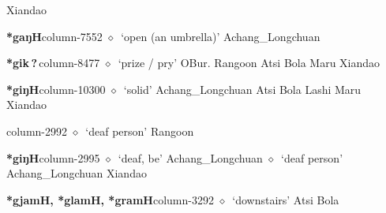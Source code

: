          Xiandao 
  \item {\footnotesize \textbf{*gaŋH}}{\tiny column-7552}
         $\diamond$~`open (an umbrella)'
         Achang\_Longchuan 
  \item {\footnotesize \textbf{*gik\,?\,}}{\tiny column-8477}
         $\diamond$~`prize / pry'
         OBur. 
\hspace{1ex}
         Rangoon 
\hspace{1ex}
         Atsi 
\hspace{1ex}
         Bola 
\hspace{1ex}
         Maru 
\hspace{1ex}
         Xiandao 
  \item {\footnotesize \textbf{*giŋH}}{\tiny column-10300}
         $\diamond$~`solid'
         Achang\_Longchuan 
\hspace{1ex}
         Atsi 
\hspace{1ex}
         Bola 
\hspace{1ex}
         Lashi 
\hspace{1ex}
         Maru 
\hspace{1ex}
         Xiandao 
  \item {\footnotesize \textbf{}}{\tiny column-2992}
         $\diamond$~`deaf person'
         Rangoon 
  \item {\footnotesize \textbf{*giŋH}}{\tiny column-2995}
         $\diamond$~`deaf, be'
         Achang\_Longchuan 
\hspace{1ex}
         $\diamond$~`deaf person'
         Achang\_Longchuan 
\hspace{1ex}
         Xiandao 
  \item {\footnotesize \textbf{*gjamH, *glamH, *gramH}}{\tiny column-3292}
         $\diamond$~`downstairs'
         Atsi 
\hspace{1ex}
         Bola 
\hspace{1ex}
